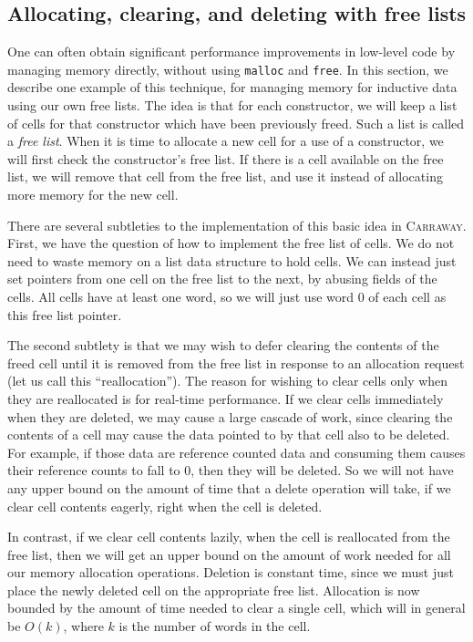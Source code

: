 \documentclass{book}[12pt]
\newcommand{\carraway}[0]{\textsc{Carraway}\xspace}
\begin{document}
\subsection{Allocating, clearing, and deleting with free lists}

One can often obtain significant performance improvements in low-level
code by managing memory directly, without using \texttt{malloc} and
\texttt{free}.  In this section, we describe one example of this
technique, for managing memory for inductive data using our own free
lists.  The idea is that for each constructor, we will keep a list of
cells for that constructor which have been previously freed.  Such a
list is called a \emph{free list}.  When it is time to allocate a new
cell for a use of a constructor, we will first check the constructor's
free list.  If there is a cell available on the free list, we will
remove that cell from the free list, and use it instead of allocating
more memory for the new cell.

There are several subtleties to the implementation of this basic idea
in \carraway.  First, we have the question of how to implement the
free list of cells.  We do not need to waste memory on a list data
structure to hold cells.  We can instead just set pointers from one
cell on the free list to the next, by abusing fields of the cells.
All cells have at least one word, so we will just use word 0 of each
cell as this free list pointer. 

The second subtlety is that we may wish to defer clearing the contents
of the freed cell until it is removed from the free list in response
to an allocation request (let us call this ``reallocation'').  The
reason for wishing to clear cells only when they are reallocated is
for real-time performance.  If we clear cells immediately when they
are deleted, we may cause a large cascade of work, since clearing the
contents of a cell may cause the data pointed to by that cell also to
be deleted.  For example, if those data are reference counted data and
consuming them causes their reference counts to fall to $0$, then they
will be deleted.  So we will not have any upper bound on the amount of
time that a delete operation will take, if we clear cell contents
eagerly, right when the cell is deleted.

In contrast, if we clear cell contents lazily, when the cell is
reallocated from the free list, then we will get an upper bound on the
amount of work needed for all our memory allocation operations.
Deletion is constant time, since we must just place the newly deleted
cell on the appropriate free list.  Allocation is now bounded by the
amount of time needed to clear a single cell, which will in general be
$O(k)$, where $k$ is the number of words in the cell.  
\end{document}
